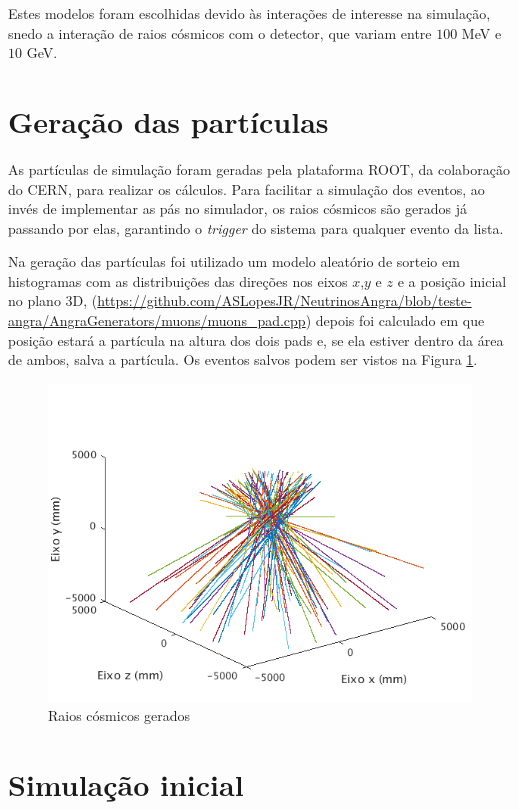 Estes modelos foram escolhidas devido às interações de interesse na simulação, snedo a interação de raios cósmicos com o detector, que variam entre $100$ MeV e $10$ GeV.


\section{Geração das partículas}

As partículas de simulação foram geradas pela plataforma ROOT, da colaboração do \ac{CERN}, para realizar os cálculos. Para facilitar a simulação dos eventos, ao invés de implementar as pás no simulador, os raios cósmicos são gerados já passando por elas, garantindo o \emph{trigger} do sistema para qualquer evento da lista. 

 Na geração das partículas foi utilizado um modelo aleatório de sorteio em histogramas com as distribuições das direções nos eixos $x$,$y$ e $z$ e a posição inicial no plano 3D, (\url{https://github.com/ASLopesJR/NeutrinosAngra/blob/teste-angra/AngraGenerators/muons/muons_pad.cpp}) depois foi calculado em que posição estará a partícula na altura dos dois pads e, se ela estiver dentro da área de ambos, salva a partícula. Os eventos salvos podem ser vistos na Figura \ref{fig:geracao}.

\begin{figure}[H]
	\centering
	\includegraphics[width=16cm]{textuais/simulacao/figuras/geracao.png}
	\caption{Raios cósmicos gerados}
	\label{fig:geracao}
\end{figure}


\section{Simulação inicial}

